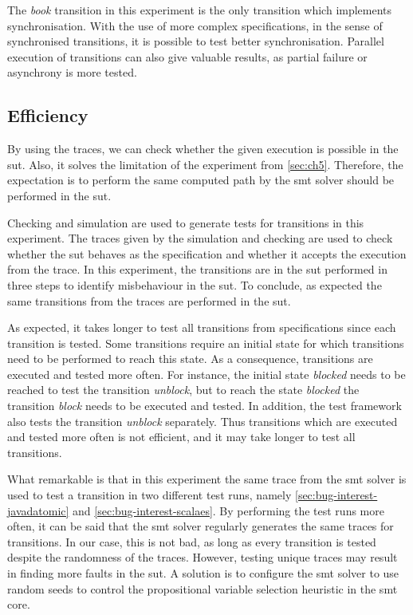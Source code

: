The \textit{book} transition in this experiment is the only transition which
implements synchronisation. With the use of more complex specifications, in the
sense of synchronised transitions, it is possible to test better
synchronisation. Parallel execution of transitions can also give valuable
results, as partial failure or asynchrony is more tested.

\subsection{Efficiency}

By using the traces, we can check whether the given execution is possible in the
\gls{sut}. Also, it solves the limitation of the experiment from
\autoref{sec:ch5}. Therefore, the expectation is to perform the same computed
path by the \gls{smt} solver should be performed in the \gls{sut}.

Checking and simulation are used to generate tests for transitions in this
experiment. The traces given by the simulation and checking are used to check
whether the \gls{sut} behaves as the specification and whether it accepts the
execution from the trace. In this experiment, the transitions are in the
\gls{sut} performed in three steps to identify misbehaviour in the \gls{sut}.
To conclude, as expected the same transitions from the traces are performed in
the \gls{sut}.

As expected, it takes longer to test all transitions from specifications since
each transition is tested. Some transitions require an initial state for which
transitions need to be performed to reach this state. As a consequence,
transitions are executed and tested more often. For instance, the initial state
\textit{blocked} needs to be reached to test the transition \textit{unblock},
but to reach the state \textit{blocked} the transition \textit{block} needs to
be executed and tested. In addition, the test framework also tests the
transition \textit{unblock} separately. Thus transitions which are executed and
tested more often is not efficient, and it may take longer to test all
transitions.

What remarkable is that in this experiment the same trace from the \gls{smt}
solver is used to test a transition in two different test runs, namely
\autoref{sec:bug-interest-javadatomic} and \autoref{sec:bug-interest-scalaes}.
By performing the test runs more often, it can be said that the \gls{smt} solver
regularly generates the same traces for transitions. In our case, this is not
bad, as long as every transition is tested despite the randomness of the traces.
However, testing unique traces may result in finding more faults in the
\gls{sut}. A solution is to configure the \gls{smt} solver to use random seeds
to control the propositional variable selection heuristic in the \gls{smt} core.

